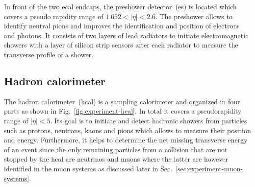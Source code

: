 In front of the two \gls{ecal} endcaps, the preshower detector~(\gls{es}) is located which covers a pseudo rapidity range of $1.652<|\eta|<2.6$. The preshower allows to identify neutral pions and improves the identification and position of electrons and photons. It consists of two layers of lead radiators to initiate electromagnetic showers with a layer of silicon strip sensors after each radiator to measure the transverse profile of a shower.

\subsection{Hadron calorimeter}

The hadron calorimeter~(\gls{hcal}) is a sampling calorimeter and organized in four parts as shown in Fig.~\ref{fig:experiment-hcal}. In total it covers a pseudorapidity range of $|\eta|<5$. Its goal is to initiate and detect hadronic showers from particles such as protons, neutrons, kaons and pions which allows to measure their position and energy. Furthermore, it helps to determine the net missing transverse energy of an event since the only remaining particles from a collision that are not stopped by the \gls{hcal} are neutrinos and muons where the latter are however identified in the muon systems as discussed later in Sec.~\ref{sec:experiment-muon-systems}.


